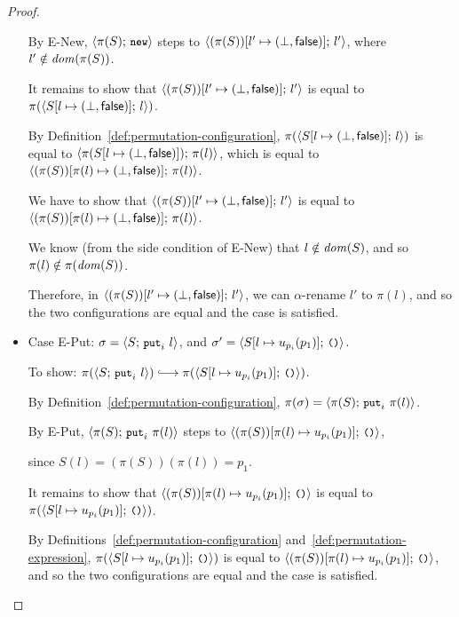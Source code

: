 \begin{proof}
\begin{itemize}
    By {\sc E-New}, $\langle \pi(S);\, \mbox{\small{\texttt{new}}} \rangle$ steps to
    $\langle (\pi(S))[l' \mapsto (\bot, \textsf{false})];\, l' \rangle$, where
    $l' \notin \mathit{dom}(\pi(S))$.
    
    It remains to show that
    $\langle (\pi(S))[l' \mapsto (\bot, \textsf{false})];\, l' \rangle$ is equal
    to $\pi(\langle S[l \mapsto (\bot, \textsf{false})];\, l \rangle)$.

    By Definition~\ref{def:permutation-configuration},
    $\pi(\langle S[l \mapsto (\bot, \textsf{false})];\, l \rangle)$ is equal to
    $\langle \pi(S[l \mapsto (\bot, \textsf{false})]);\, \pi(l) \rangle$, which
    is equal to
    $\langle (\pi(S))[\pi(l) \mapsto (\bot, \textsf{false})];\, \pi(l) \rangle$.

    We have to show that
    $\langle (\pi(S))[l' \mapsto (\bot, \textsf{false})];\, l' \rangle$ is equal
    to
    $\langle (\pi(S))[\pi(l) \mapsto (\bot, \textsf{false})];\, \pi(l) \rangle$.

    We know (from the side condition of {\sc E-New}) that $l \notin
    \mathit{dom}(S)$, and so $\pi(l) \notin \pi(\mathit{dom}(S))$.

    Therefore, in
    $\langle (\pi(S))[l' \mapsto (\bot, \textsf{false})];\, l' \rangle$, we can
    $\alpha$-rename $l'$ to $\pi(l)$, and so the two configurations
    are equal and the case is satisfied.

  \item Case {\sc E-Put}: $\sigma = \langle S;\, \mbox{\small{\texttt{put}}}_i~l \rangle$, and
    $\sigma' = \langle S[l \mapsto u_{p_i}(p_1)];\, \mbox{\small{\texttt{()}}} \rangle$.

    To show: $\pi(\config{S}{\putiexp{l}}) \parstepsto
    \pi(\config{\extSRaw{S}{l}{u_{p_i}(p_1)}}{\unit})$.

    By Definition~\ref{def:permutation-configuration}, $\pi(\sigma) =
    \langle \pi(S);\, \mbox{\small{\texttt{put}}}_i~\pi(l) \rangle$.

    By {\sc E-Put}, $\langle \pi(S);\, \mbox{\small{\texttt{put}}}_i~\pi(l) \rangle$ steps to
    $\langle (\pi(S))[\pi(l) \mapsto u_{p_i}(p_1)];\, \mbox{\small{\texttt{()}}} \rangle$,

    since $S(l) = (\pi(S))(\pi(l)) = p_1$.

    It remains to show that
    $\langle (\pi(S))[\pi(l) \mapsto u_{p_i}(p_1)];\, \mbox{\small{\texttt{()}}} \rangle$ is
    equal to $\pi(\langle S[l \mapsto u_{p_i}(p_1)];\, \mbox{\small{\texttt{()}}} \rangle)$.

    By Definitions~\ref{def:permutation-configuration}
    and~\ref{def:permutation-expression},
    $\pi(\langle S[l \mapsto u_{p_i}(p_1)];\, \mbox{\small{\texttt{()}}} \rangle)$ is equal to
    $\langle (\pi(S))[\pi(l) \mapsto u_{p_i}(p_1)];\, \mbox{\small{\texttt{()}}} \rangle$, and
    so the two configurations are equal and the case is satisfied.


\end{itemize}
\end{proof}
